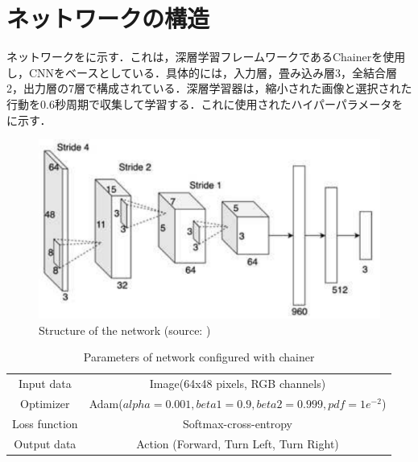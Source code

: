 
\section{ネットワークの構造}

  ネットワークをに示す．これは，深層学習フレームワークであるChainer\cite{chainer}を使用し，CNNをベースとしている．具体的には，入力層，畳み込み層3，全結合層2，出力層の7層で構成されている．深層学習器は，縮小された画像と選択された行動を0.6秒周期で収集して学習する．これに使用されたハイパーパラメータをに示す．

  \begin{figure}[h]
    \centering
    \includegraphics[keepaspectratio, scale=0.70] {images/pdf/okada_network}
    \caption[Structure of the network]{Structure of the network (source: \cite{okada})}
    \label{Fig:okada_network}
  \end{figure}

  \begin{table}[hbtp]
    \caption{Parameters of network configured with chainer}
    \label{tab:Parameters of network configured with chainer}
    \centering
    \begin{tabular}{cc}
      \hline
      Input data & Image(64x48 pixels, RGB channels) \\
      Optimizer & Adam($alpha = 0.001, beta1 = 0.9, beta2 =  0.999, pdf = 1e^{-2}$)\\
      Loss function & Softmax-cross-entropy\\
      Output data & Action (Forward, Turn Left, Turn Right)\\
      \hline
    \end{tabular}
  \end{table}

\newpage